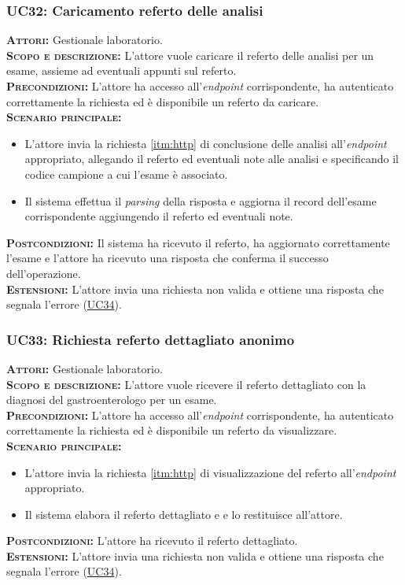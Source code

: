 \subsubsection{UC32: Caricamento referto delle analisi}
\label{sec:UC32}
\textsc{\textbf{Attori:}} Gestionale laboratorio.\\
\textsc{\textbf{Scopo e descrizione:}} L'attore vuole caricare il referto delle analisi per un esame, assieme ad eventuali appunti sul referto.\\
\textsc{\textsc{\textbf{Precondizioni:}}} L'attore ha accesso all'\textit{endpoint} corrispondente, ha autenticato correttamente la richiesta ed è disponibile un referto da caricare.\\
\textsc{\textbf{Scenario principale:}}  \begin{itemize}
    \item L'attore invia la richiesta \ref{itm:http} di conclusione delle analisi all'\textit{endpoint} appropriato, allegando il referto ed eventuali note alle analisi e specificando il codice campione a cui l'esame è associato.
    \item Il sistema effettua il \textit{parsing} della risposta e aggiorna il record dell'esame corrispondente aggiungendo il referto ed eventuali note.
\end{itemize}
\textsc{\textbf{Postcondizioni:}} Il sistema ha ricevuto il referto, ha aggiornato correttamente l'esame e l'attore ha ricevuto una risposta che conferma il successo dell'operazione.\\
\textsc{\textbf{Estensioni:}} L'attore invia una richiesta non valida e ottiene una risposta che segnala l'errore (\hyperref[sec:UC34]{UC34}).

\subsubsection{UC33: Richiesta referto dettagliato anonimo}
\label{sec:UC33}
\textsc{\textbf{Attori:}} Gestionale laboratorio.\\
\textsc{\textbf{Scopo e descrizione:}} L'attore vuole ricevere il referto dettagliato con la diagnosi del gastroenterologo per un esame.\\
\textsc{\textsc{\textbf{Precondizioni:}}} L'attore ha accesso all'\textit{endpoint} corrispondente, ha autenticato correttamente la richiesta ed è disponibile un referto da visualizzare.\\
\textsc{\textbf{Scenario principale:}}  \begin{itemize}
    \item L'attore invia la richiesta \ref{itm:http} di visualizzazione del referto all'\textit{endpoint} appropriato.
    \item Il sistema elabora il referto dettagliato e e lo restituisce all'attore.
\end{itemize}
\textsc{\textbf{Postcondizioni:}} L'attore ha ricevuto il referto dettagliato.\\
\textsc{\textbf{Estensioni:}} L'attore invia una richiesta non valida e ottiene una risposta che segnala l'errore (\hyperref[sec:UC34]{UC34}).

